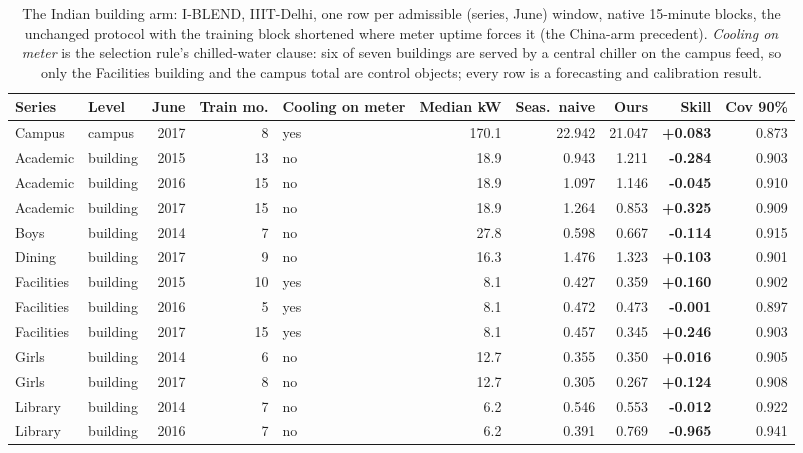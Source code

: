 \begin{table}[t]
\centering
\scriptsize
\setlength{\tabcolsep}{3pt}
\begin{tabular}{llrrlrrrrr}
\toprule
Series & Level & June & Train mo. & Cooling on meter & Median kW & Seas.\ naive & Ours & Skill & Cov 90\% \\
\midrule
Campus & campus & 2017 & 8 & yes & 170.1 & 22.942 & 21.047 & \textbf{+0.083} & 0.873 \\
Academic & building & 2015 & 13 & no & 18.9 & 0.943 & 1.211 & \textbf{-0.284} & 0.903 \\
Academic & building & 2016 & 15 & no & 18.9 & 1.097 & 1.146 & \textbf{-0.045} & 0.910 \\
Academic & building & 2017 & 15 & no & 18.9 & 1.264 & 0.853 & \textbf{+0.325} & 0.909 \\
Boys & building & 2014 & 7 & no & 27.8 & 0.598 & 0.667 & \textbf{-0.114} & 0.915 \\
Dining & building & 2017 & 9 & no & 16.3 & 1.476 & 1.323 & \textbf{+0.103} & 0.901 \\
Facilities & building & 2015 & 10 & yes & 8.1 & 0.427 & 0.359 & \textbf{+0.160} & 0.902 \\
Facilities & building & 2016 & 5 & yes & 8.1 & 0.472 & 0.473 & \textbf{-0.001} & 0.897 \\
Facilities & building & 2017 & 15 & yes & 8.1 & 0.457 & 0.345 & \textbf{+0.246} & 0.903 \\
Girls & building & 2014 & 6 & no & 12.7 & 0.355 & 0.350 & \textbf{+0.016} & 0.905 \\
Girls & building & 2017 & 8 & no & 12.7 & 0.305 & 0.267 & \textbf{+0.124} & 0.908 \\
Library & building & 2014 & 7 & no & 6.2 & 0.546 & 0.553 & \textbf{-0.012} & 0.922 \\
Library & building & 2016 & 7 & no & 6.2 & 0.391 & 0.769 & \textbf{-0.965} & 0.941 \\
\bottomrule
\end{tabular}
\caption{The Indian building arm: I-BLEND, IIIT-Delhi, one row per admissible (series, June) window, native 15-minute blocks, the unchanged protocol with the training block shortened where meter uptime forces it (the China-arm precedent). \emph{Cooling on meter} is the selection rule's chilled-water clause: six of seven buildings are served by a central chiller on the campus feed, so only the Facilities building and the campus total are control objects; every row is a forecasting and calibration result.}
\label{tab:iblend}
\end{table}
